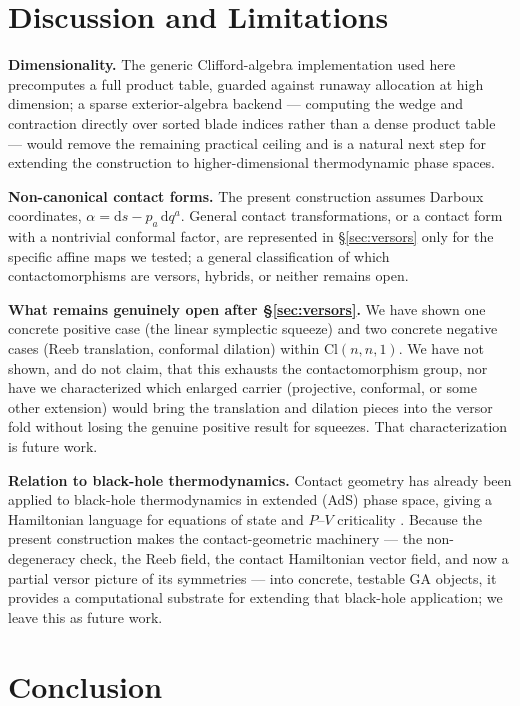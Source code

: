 \documentclass[11pt]{article}
\newcommand{\Cl}{\mathrm{Cl}}
\newcommand{\dif}{\mathrm{d}}
\begin{document}
\section{Discussion and Limitations}

\textbf{Dimensionality.} The generic Clifford-algebra implementation used here precomputes a full product table, guarded against runaway allocation at high dimension; a sparse exterior-algebra backend — computing the wedge and contraction directly over sorted blade indices rather than a dense product table — would remove the remaining practical ceiling and is a natural next step for extending the construction to higher-dimensional thermodynamic phase spaces.

\textbf{Non-canonical contact forms.} The present construction assumes Darboux coordinates, $\alpha = \dif s - p_a\,\dif q^a$. General contact transformations, or a contact form with a nontrivial conformal factor, are represented in \S\ref{sec:versors} only for the specific affine maps we tested; a general classification of which contactomorphisms are versors, hybrids, or neither remains open.

\textbf{What remains genuinely open after \S\ref{sec:versors}.} We have shown one concrete positive case (the linear symplectic squeeze) and two concrete negative cases (Reeb translation, conformal dilation) within $\Cl(n,n,1)$. We have not shown, and do not claim, that this exhausts the contactomorphism group, nor have we characterized which enlarged carrier (projective, conformal, or some other extension) would bring the translation and dilation pieces into the versor fold without losing the genuine positive result for squeezes. That characterization is future work.

\textbf{Relation to black-hole thermodynamics.} Contact geometry has already been applied to black-hole thermodynamics in extended (AdS) phase space, giving a Hamiltonian language for equations of state and $P$--$V$ criticality \cite{ghosh2019contact}. Because the present construction makes the contact-geometric machinery — the non-degeneracy check, the Reeb field, the contact Hamiltonian vector field, and now a partial versor picture of its symmetries — into concrete, testable GA objects, it provides a computational substrate for extending that black-hole application; we leave this as future work.

\section{Conclusion}
\end{document}
